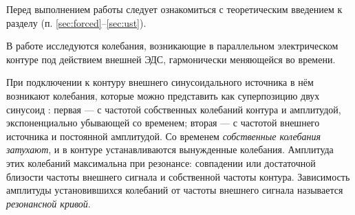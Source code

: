 


Перед выполнением работы следует ознакомиться с теоретическим введением
к разделу (п. \ref{sec:forced}--\ref{sec:ust}).

В работе исследуются колебания, возникающие в параллельном электрическом 
контуре под действием внешней ЭДС, гармонически меняющейся во времени.

При подключении к контуру внешнего синусоидального источника в нём 
возникают колебания, которые можно представить как суперпозицию двух 
синусоид : первая --- с частотой собственных колебаний контура и 
амплитудой, экспоненциально убывающей со временем; вторая --- с частотой 
внешнего источника и постоянной амплитудой. Со временем \emph{собственные 
колебания затухают}, и в контуре устанавливаются вынужденные колебания. 
Амплитуда этих колебаний максимальна при резонансе: совпадении или 
достаточной близости частоты внешнего сигнала и собственной 
частоты контура. Зависимость амплитуды установившихся колебаний от 
частоты внешнего сигнала называется \emph{резонансной кривой}.




